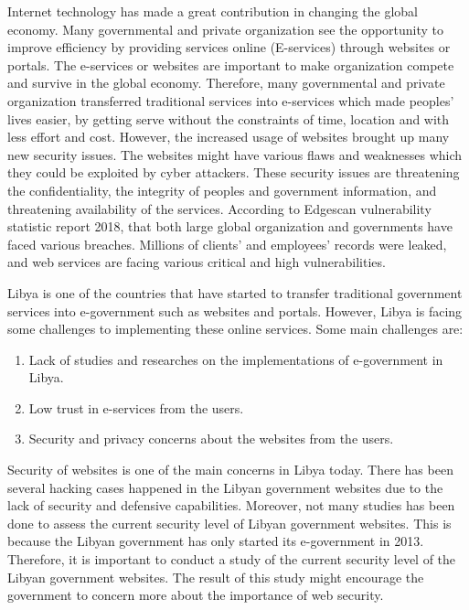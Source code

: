 \documentclass[conference,letterpaper]{IEEEtran}
\begin{document}
Internet technology has made a great contribution in changing the
global economy. Many governmental and private organization see the
opportunity to improve efficiency by providing services online
(E-services) through websites or
portals\cite{zhao2010opportunities}\cite{ismailova2017web}.  The
e-services or websites are important to make organization compete and
survive in the global economy. Therefore, many governmental and
private organization transferred traditional services into e-services
which made peoples’ lives easier, by getting serve without the
constraints of time, location and with less effort and
cost\cite{reddick2012channel}.  However, the increased usage of
websites brought up many new security
issues\cite{felderer2016security}. The websites might have various
flaws and weaknesses which they could be exploited by cyber
attackers. These security issues are threatening the confidentiality,
the integrity of peoples and government information, and threatening
availability of the
services\cite{al2015security,yusof2013evaluating,kasimin2013using}. According
to Edgescan vulnerability statistic report 2018, that both large
global organization and governments have faced various
breaches. Millions of clients’ and employees’ records were leaked, and
web services are facing various critical and high vulnerabilities.

Libya is one of the countries that have started to transfer
traditional government services into e-government such as websites and
portals. However, Libya is facing some challenges to implementing
these online services. Some main challenges
are\cite{ahmed2011potential}\cite{elaswad2016identity}:
\begin{enumerate}
\item Lack of studies and researches on the implementations of e-government in Libya.
\item Low trust in e-services from the users.
\item Security and privacy concerns about the websites from the users.
\end{enumerate}

Security of websites is one of the main concerns in
Libya today\cite{gebba2012government}\cite{elmansori2017factors}.
There has been several hacking cases happened in the Libyan government
websites due to the lack of security and defensive
capabilities\cite{tehrani2013cyber,yusof2011cyber}. Moreover, not many studies has been done to assess the current security level of
Libyan government websites\cite{ihmouda2013penetration}. This is because the Libyan government has only started its e-government in 2013. Therefore, it
is important to conduct a study of the current security level of the Libyan government websites. The result of this study might encourage
the government to concern more about the importance of web security\cite{forti2017new}.
\end{document}
